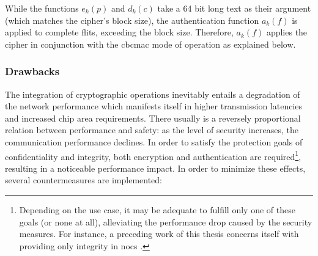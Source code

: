 While the functions $e_k(p)$ and $d_k(c)$ take a 64 bit long text as their argument (which matches the cipher's block size), the authentication
function $a_k(f)$ is applied to complete flits, exceeding the block size. Therefore, $a_k(f)$ applies the cipher in conjunction with the \gls{cbcmac}
mode of operation as explained below.

\subsubsection{Drawbacks}
The integration of cryptographic operations inevitably entails a degradation of the network performance which manifests itself in higher transmission
latencies and increased chip area requirements. There usually is a reversely proportional relation between performance and safety: as the level of security
increases, the communication performance declines. In order to satisfy the protection goals of confidentiality and integrity, both encryption and
authentication are required\footnote{Depending on the use case, it may be adequate to fulfill only one of these goals (or none at all), alleviating
the performance drop caused by the security measures. For instance, a preceding work of this thesis concerns itself with providing only integrity in
\glspl{noc} \cite{moriam18activeattackers}.}, resulting in a noticeable performance impact. In order to minimize these effects, several countermeasures
are implemented:
